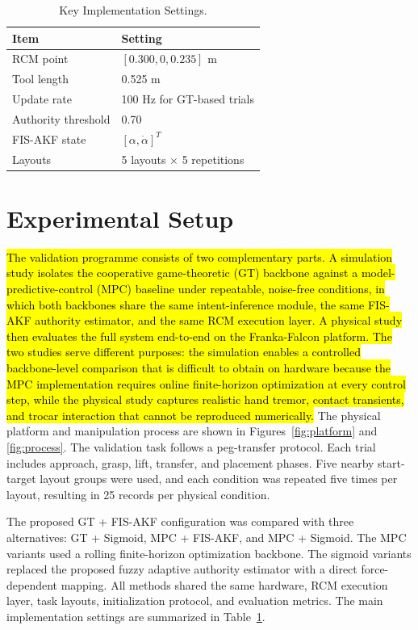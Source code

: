 \documentclass[conference]{IEEEtran}
\begin{document}
\begin{table}[t]
\caption{Key Implementation Settings.}
\begin{center}
\begin{tabular}{ll}
\hline
Item & Setting \\
\hline
RCM point & $[0.300,0,0.235]$ m \\
Tool length & 0.525 m \\
Update rate & 100 Hz for GT-based trials \\
Authority threshold & 0.70 \\
FIS-AKF state & $[\alpha,\dot{\alpha}]^T$ \\
Layouts & 5 layouts $\times$ 5 repetitions \\
\hline
\end{tabular}
\label{tab:param}
\end{center}
\end{table}

\section{Experimental Setup}
\hl{The validation programme consists of two complementary parts. A simulation study isolates the cooperative game-theoretic (GT) backbone against a model-predictive-control (MPC) baseline under repeatable, noise-free conditions, in which both backbones share the same intent-inference module, the same FIS-AKF authority estimator, and the same RCM execution layer. A physical study then evaluates the full system end-to-end on the Franka-Falcon platform. The two studies serve different purposes: the simulation enables a controlled backbone-level comparison that is difficult to obtain on hardware because the MPC implementation requires online finite-horizon optimization at every control step, while the physical study captures realistic hand tremor, contact transients, and trocar interaction that cannot be reproduced numerically.} The physical platform and manipulation process are shown in Figures~\ref{fig:platform} and \ref{fig:process}. The validation task follows a peg-transfer protocol. Each trial includes approach, grasp, lift, transfer, and placement phases. Five nearby start-target layout groups were used, and each condition was repeated five times per layout, resulting in 25 records per physical condition.

The proposed GT + FIS-AKF configuration was compared with three alternatives: GT + Sigmoid, MPC + FIS-AKF, and MPC + Sigmoid. The MPC variants used a rolling finite-horizon optimization backbone. The sigmoid variants replaced the proposed fuzzy adaptive authority estimator with a direct force-dependent mapping. All methods shared the same hardware, RCM execution layer, task layouts, initialization protocol, and evaluation metrics. The main implementation settings are summarized in Table~\ref{tab:param}.
\end{document}
